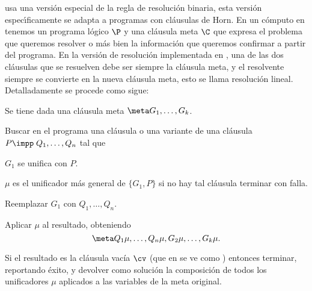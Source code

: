 \documentclass[11pt,letterpaper]{article}
\begin{document}
{\pl}  usa una versi\'on especial de la regla de resoluci\'on binaria, esta
versi\'on espec\'{\i}ficamente se adapta a programas con cl\'ausulas de
Horn. En un c\'omputo en {\pl} tenemos un programa l\'ogico $\P$ y una
cl\'ausula meta $\C$ que expresa el problema que queremos resolver o m\'as 
bien la informaci\'on que queremos confirmar a partir del programa. 
En la versi\'on de resoluci\'on implementada en {\pl}, una de las dos 
cl\'ausulas que se resuelven debe ser siempre la cl\'ausula meta, y el 
resolvente siempre se convierte en la nueva cl\'ausula meta, esto se llama 
resoluci\'on lineal.
Detalladamente se procede como sigue:
\be
\item Se tiene dada una cl\'ausula meta $\meta G_1,\ldots, G_k$.
\item Buscar en el programa una cl\'ausula o una variante de una cl\'ausula
$P\impp\; Q_1,\ldots, Q_n$ tal que 
\bi
\item $G_1$ se unifica con $P$.
\item $\mu$ es el unificador m\'as general de $\{G_1,P\}$
\ei
si no hay tal cl\'ausula terminar con falla.
\item Reemplazar $G_1$ con $Q_1,\ldots, Q_n$.
\item Aplicar $\mu$ al resultado, obteniendo
$$ \meta Q_1\mu,\ldots,Q_n\mu,G_2\mu,\ldots,G_k\mu. $$
\item Si el resultado es la cl\'ausula vac\'ia $\cv$ (que en {\pl} se ve 
  como \meta) entonces terminar, reportando éxito, y devolver como soluci\'on 
la   composici\'on de todos los unificadores $\mu$ aplicados a las variables de 
la   meta original.
\ee   
 
\end{document}
